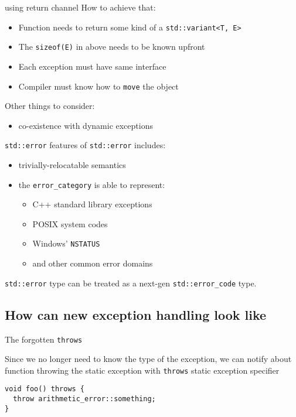 \documentclass[10pt,a4paper]{beamer}
\begin{document}
\begin{frame}{using return channel}
	How to achieve that:
	\begin{itemize}
		\item Function needs to return some kind of a \texttt{std::variant<T, E>}
		\item The \texttt{sizeof(E)} in above needs to be known upfront
		\item Each exception must have same interface
		\item Compiler must know how to \texttt{move} the object
	\end{itemize}
	
	Other things to consider:
	\begin{itemize}
		\item co-existence with dynamic exceptions
	\end{itemize}
\end{frame}
	
\begin{frame}{\texttt{std::error}}
	features of \texttt{std::error} includes:
	\begin{itemize}
		\item trivially-relocatable semantics
		\item the \texttt{error\_category} is able to represent:
		\begin{itemize}
			\item C++ standard library exceptions
			\item POSIX system codes
			\item Windows' \texttt{NSTATUS}
			\item and other common error domains
		\end{itemize}
	\end{itemize}

	\vfill

	\texttt{std::error} type can be treated as a next-gen \texttt{std::error\_code} type.
\end{frame}
	
	
\subsection{How can new exception handling look like}

	
\begin{frame}[fragile]{The forgotten \texttt{throws}}
	
	Since we no longer need to know the type of the exception,
	we can notify about function throwing the static exception with \texttt{throws}
	static exception specifier
	
	\begin{verbatim}
void foo() throws {
  throw arithmetic_error::something;
}
	\end{verbatim}
	
\end{frame}
\end{document}

